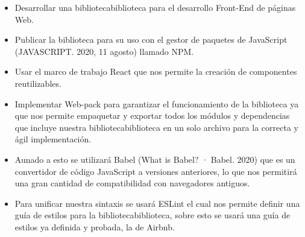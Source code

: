   \begin{itemize}
 \item Desarrollar una bibliotecabiblioteca para el desarrollo Front-End de páginas Web.
 \item Publicar la biblioteca para su uso con el gestor de paquetes de JavaScript \cite{javascript} (JAVASCRIPT. 2020, 11 agosto) llamado NPM.
 \item Usar el marco de trabajo React que nos permite la creación de componentes reutilizables.
 \item Implementar Web-pack para garantizar el funcionamiento de la biblioteca ya que nos permite empaquetar y exportar todos los módulos y dependencias que incluye nuestra bibliotecabiblioteca en un solo archivo para la correcta y ágil implementación. 
 \item Aunado a esto se utilizará Babel \cite{babel} (What is Babel? · Babel. 2020) que es un convertidor de código JavaScript a versiones anteriores, lo que nos permitirá una gran cantidad de compatibilidad con navegadores antiguos. 
 \item Para unificar nuestra sintaxis se usará ESLint el cual nos permite definir una guía de estilos para la bibliotecabiblioteca, sobre esto se usará una guía de estilos ya definida y probada, la de Airbnb. 
   \end{itemize}
\newpage
